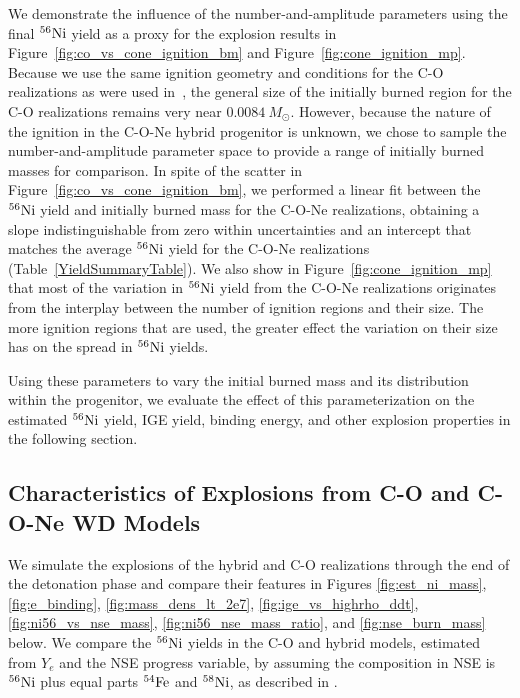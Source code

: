 \documentclass[iop,apj]{emulateapj}
\newcommand{\tabref}[1]{Table~\ref{#1}}
\newcommand{\figref}[1]{Figure~\ref{#1}}
\newcommand{\Ni}[1]{\ensuremath{{}^{#1}{\rm Ni}}}
\newcommand{\Fe}[1]{\ensuremath{{}^{#1}{\rm Fe}}}
\newcommand{\Msun}{\ensuremath{M_\odot}}
\begin{document}
We demonstrate the influence of the number-and-amplitude parameters
using the final \Ni{56} yield as a proxy for the explosion results in
\figref{fig:co_vs_cone_ignition_bm} and \figref{fig:cone_ignition_mp}.
Because we use the same ignition geometry and conditions for the C-O
realizations as were used in~\citet{kruegetal12}, the general size of
the initially burned region for the C-O realizations remains very near
$0.0084~\Msun$. However, because the nature of the ignition in the
C-O-Ne hybrid progenitor is unknown, we chose to sample the
number-and-amplitude parameter space to provide a range of initially
burned masses for comparison. In spite of the scatter in
\figref{fig:co_vs_cone_ignition_bm}, we performed a linear fit between
the \Ni{56} yield and initially burned mass for the C-O-Ne
realizations, obtaining a slope indistinguishable from zero within
uncertainties and an intercept that matches the average \Ni{56} yield
for the C-O-Ne realizations (\tabref{YieldSummaryTable}). We also show
in \figref{fig:cone_ignition_mp} that most of the variation in \Ni{56}
yield from the C-O-Ne realizations originates from the interplay
between the number of ignition regions and their size. The more
ignition regions that are used, the greater effect the variation on
their size has on the spread in \Ni{56} yields.

Using these parameters to vary the initial burned mass and its
distribution within the progenitor, we evaluate the effect of this
parameterization on the estimated \Ni{56} yield, IGE yield, binding
energy, and other explosion properties in the following section.

\subsection{Characteristics of Explosions from C-O and C-O-Ne WD Models}
We simulate the explosions of the hybrid and C-O realizations through
the end of the detonation phase and compare their features in Figures
\ref{fig:est_ni_mass}, \ref{fig:e_binding},
\ref{fig:mass_dens_lt_2e7}, \ref{fig:ige_vs_highrho_ddt},
\ref{fig:ni56_vs_nse_mass}, \ref{fig:ni56_nse_mass_ratio}, and
\ref{fig:nse_burn_mass} below. We compare the \Ni{56} yields in the
C-O and hybrid models, estimated from $Y_e$ and the NSE progress
variable, by assuming the composition in NSE is \Ni{56} plus equal
parts \Fe{54} and \Ni{58}, as described in
\citet{townetal2009,Meaketal09}.
\end{document}
